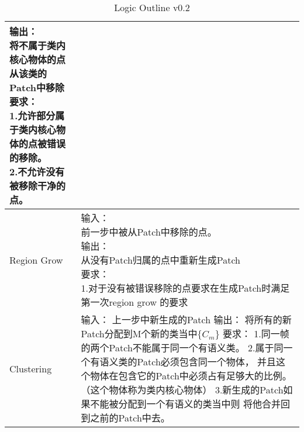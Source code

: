 \begin{table*}[!hbp]
\begin{tabular}{p{}|p{}}
{			输出：\\
			将不属于类内核心物体的点从该类的Patch中移除\\
			要求：\\
			1.允许部分属于类内核心物体的点被错误的移除。\\
			2.不允许没有被移除干净的点。}\\
		\hline
		Region Grow&\tabincell{l}{
			输入：\\
			前一步中被从Patch中移除的点。\\
			输出：\\
			从没有Patch归属的点中重新生成Patch\\
			要求：\\
			1.对于没有被错误移除的点要求在生成Patch时满足第一次region grow 的要求}\\
		\hline
		Clustering&\tabincell{l}{
			输入：\\
			上一步中新生成的Patch\\
			输出：\\
			将所有的新Patch分配到M个新的类当中$\{C_m\}$\\
			要求：\\
			1.同一帧的两个Patch不能属于同一个有语义类。\\
			2.属于同一个有语义类的Patch必须包含同一个物体，\\并且这个物体在包含它的Patch中必须占有足够大的比例。（这个物体称为类内核心物体）\\
			3.新生成的Patch如果不能被分配到一个有语义的类当中则\\将他合并回到之前的Patch中去。
			}\\
		\hline
	\end{tabular}
	\caption{Logic Outline v0.2} %
	\label{tab:logic_outline02}
\end{table*}
